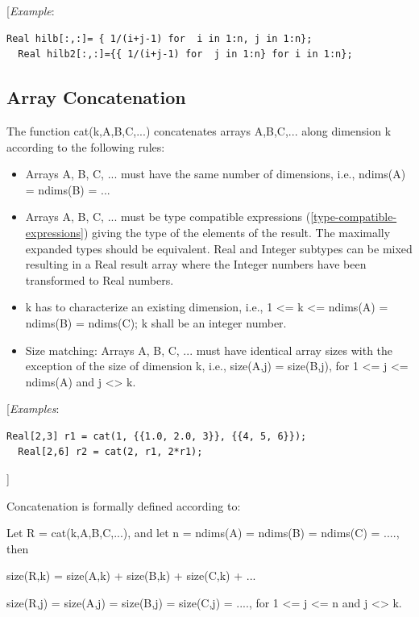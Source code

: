 \documentclass[10pt,a4paper]{report}
\def\doublelabel#1{\label{#1}}
\begin{document}
{[}\emph{Example}:

\begin{lstlisting}[language=modelica]
  Real hilb[:,:]= { 1/(i+j-1) for  i in 1:n, j in 1:n};
  Real hilb2[:,:]={{ 1/(i+j-1) for  j in 1:n} for i in 1:n};
\end{lstlisting}
\subsection{Array Concatenation}\doublelabel{array-concatenation}

The function cat(k,A,B,C,...) concatenates arrays A,B,C,... along
dimension k according to the following rules:

\begin{itemize}
\item
  Arrays A, B, C, ... must have the same number of dimensions, i.e.,
  ndims(A) = ndims(B) = ...
\item
  Arrays A, B, C, ... must be type compatible expressions (\ref{type-compatible-expressions})
  giving the type of the elements of the result. The maximally expanded
  types should be equivalent. Real and Integer subtypes can be mixed
  resulting in a Real result array where the Integer numbers have been
  transformed to Real numbers.
\item
  k has to characterize an existing dimension, i.e., 1 \textless{}= k
  \textless{}= ndims(A) = ndims(B) = ndims(C); k shall be an integer
  number.
\item
  Size matching: Arrays A, B, C, ... must have identical array sizes
  with the exception of the size of dimension k, i.e., size(A,j) =
  size(B,j), for 1 \textless{}= j \textless{}= ndims(A) and j
  \textless{}\textgreater{} k.
\end{itemize}

{[}\emph{Examples}:

\begin{lstlisting}[language=modelica]
  Real[2,3] r1 = cat(1, {{1.0, 2.0, 3}}, {{4, 5, 6}});
  Real[2,6] r2 = cat(2, r1, 2*r1);
\end{lstlisting}
{]}

Concatenation is formally defined according to:

Let R = cat(k,A,B,C,...), and let n = ndims(A) = ndims(B) = ndims(C) =
...., then

size(R,k) = size(A,k) + size(B,k) + size(C,k) + ...

size(R,j) = size(A,j) = size(B,j) = size(C,j) = ...., for 1 \textless{}=
j \textless{}= n and j \textless{}\textgreater{} k.
\end{document}
